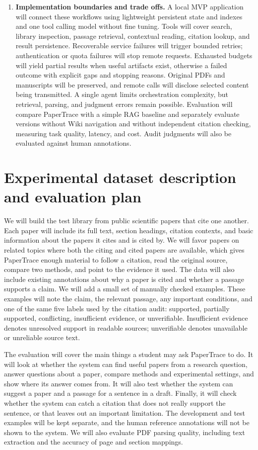 \documentclass{article}
\begin{document}
\begin{enumerate}
\item \textbf{Implementation boundaries and trade offs.} A local MVP application will connect these workflows using lightweight persistent state and indexes and one tool calling model without fine tuning. Tools will cover search, library inspection, passage retrieval, contextual reading, citation lookup, and result persistence. Recoverable service failures will trigger bounded retries; authentication or quota failures will stop remote requests. Exhausted budgets will yield partial results when useful artifacts exist, otherwise a failed outcome with explicit gaps and stopping reasons. Original PDFs and manuscripts will be preserved, and remote calls will disclose selected content being transmitted. A single agent limits orchestration complexity, but retrieval, parsing, and judgment errors remain possible. Evaluation will compare PaperTrace with a simple RAG baseline and separately evaluate versions without Wiki navigation and without independent citation checking, measuring task quality, latency, and cost. Audit judgments will also be evaluated against human annotations.
\end{enumerate}

\section{Experimental dataset description and evaluation plan}
We will build the test library from public scientific papers that cite one another. Each paper will
include its full text, section headings, citation contexts, and basic information about the papers
it cites and is cited by. We will favor papers on related topics where both the citing and cited
papers are available, which gives PaperTrace enough material to follow a citation, read the original
source, compare two methods, and point to the evidence it used. The data will also include existing
annotations about why a paper is cited and whether a passage supports a claim. We will add a small
set of manually checked examples. These examples will note the claim, the relevant passage, any
important conditions, and one of the same five labels used by the citation audit: supported,
partially supported, conflicting, insufficient evidence, or unverifiable. Insufficient evidence
denotes unresolved support in readable sources; unverifiable denotes unavailable or unreliable
source text.

The evaluation will cover the main things a student may ask PaperTrace to do. It will look at
whether the system can find useful papers from a research question, answer questions about a paper,
compare methods and experimental settings, and show where its answer comes from. It will also test
whether the system can suggest a paper and a passage for a sentence in a draft. Finally, it will
check whether the system can catch a citation that does not really support the sentence, or that
leaves out an important limitation. The development and test examples will be kept separate, and
the human reference annotations will not be shown to the system. We will also evaluate PDF parsing quality, including text extraction and the accuracy of page and section mappings.
\end{document}

